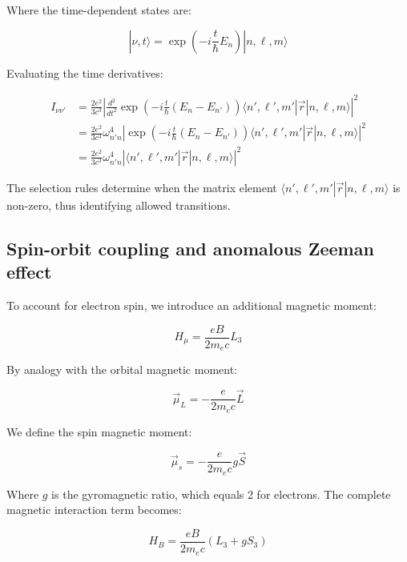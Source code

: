 \documentclass[italian]{HKNdocument}
\begin{document}
Where the time-dependent states are:

\begin{equation}
|\nu,t\rangle=\exp\left(-i\frac{t}{\hbar}E_n\right)|n,\ell,m\rangle \label{eq:12.30}
\end{equation}

Evaluating the time derivatives:

\begin{align}
I_{\nu\nu'} &=\frac{2e^2}{3c^3}\left|\frac{d^2}{dt^2}\exp\left(-i\frac{t}{\hbar}(E_n-E_{n'})\right)\langle n',\ell',m'|\vec{r}|n,\ell,m\rangle\right|^2\\
&=\frac{2e^2}{3c^3}\omega_{n'n}^4\left|\exp\left(-i\frac{t}{\hbar}(E_n-E_{n'})\right)\langle n',\ell',m'|\vec{r}|n,\ell,m\rangle\right|^2 \label{eq:12.31}\\
&=\frac{2e^2}{3c^3}\omega_{n'n}^4\left|\langle n',\ell',m'|\vec{r}|n,\ell,m\rangle\right|^2
\end{align}

The selection rules determine when the matrix element $\langle n',\ell',m'|\vec{r}|n,\ell,m\rangle$ is non-zero, thus identifying allowed transitions.

\subsection{Spin-orbit coupling and anomalous Zeeman effect}
To account for electron spin, we introduce an additional magnetic moment:

\begin{equation}
H_{\mu}=\frac{eB}{2m_e c}L_3 \label{eq:12.32}
\end{equation}

By analogy with the orbital magnetic moment:

\begin{equation}
\vec{\mu}_L=-\frac{e}{2m_e c}\vec{L} \label{eq:12.33}
\end{equation}

We define the spin magnetic moment:

\begin{equation}
\vec{\mu}_s=-\frac{e}{2m_e c}g\vec{S} \label{eq:12.34}
\end{equation}

Where $g$ is the gyromagnetic ratio, which equals 2 for electrons. The complete magnetic interaction term becomes:

\begin{equation}
H_B=\frac{eB}{2m_e c}(L_3+gS_3) \label{eq:12.35}
\end{equation}
\end{document}
